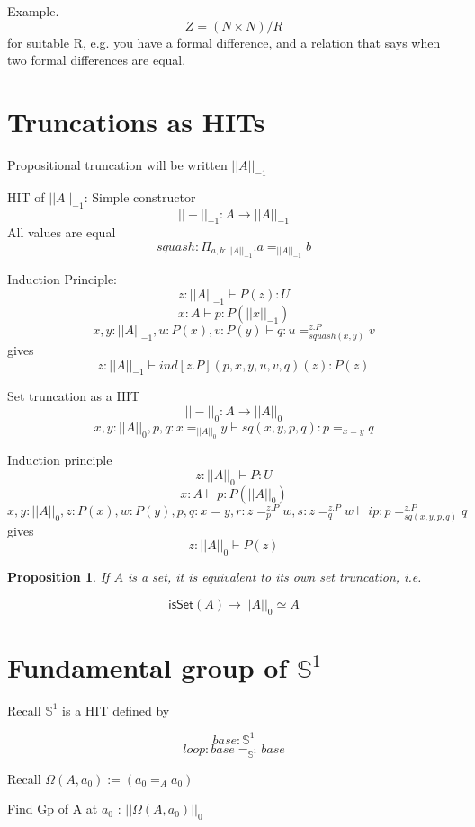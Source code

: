 \documentclass[11pt]{article}
\renewcommand{\SS}{\mathbb{S}}
\newtheorem{proposition}{Proposition}
\begin{document}
Example.
$$Z = (N \times N) / R$$
for suitable R, e.g. you have a formal difference, and a relation that says when two formal differences are equal.

\section{Truncations as HITs}
\newcommand{\ntrunc}[2]{||#1||_{#2}}
\newcommand{\propt}[1]{\ntrunc{#1}{-1}}
Propositional truncation will be written $\propt{A}$

HIT of $\propt{A}$:
Simple constructor
$$\propt{-} : A \rightarrow \propt{A}$$
All values are equal
$$squash : \Pi_{a, b : \propt{A}} . a =_{\propt{A}} b$$

Induction Principle:
$$z : \propt{A} \vdash P(z) : U$$
$$x : A \vdash p : P(\propt{x})$$
$$x, y : \propt{A}, u : P(x), v : P(y) \vdash q : u =_{squash(x, y)}^{z.P} v$$
gives
$$z : \propt{A} \vdash ind[z.P](p, x, y, u, v, q)(z) : P(z)$$

Set truncation as a HIT
\newcommand{\sett}[1]{\ntrunc{#1}{0}}
$$\sett{-} : A \rightarrow \sett{A}$$
$$x, y : \sett{A}, p, q : x =_{\sett{A}} y \vdash sq(x, y, p, q) : p =_{x = y} q$$

Induction principle
$$z : \sett{A} \vdash P : U$$
$$x : A \vdash p : P(\sett{A})$$
$$x, y : \sett{A}, z : P(x), w : P(y), p, q : x = y, r : z=_p^{z.P} w, s : z =_q^{z.P} w \vdash ip : p =_{sq(x,y,p,q)}^{z.P} q$$
gives
$$z : \sett{A} \vdash P(z)$$

\begin{proposition}\label{prop:sett}
If $A$ is a set, it is equivalent to its own set truncation, i.e.

\[\mathsf{isSet}(A) \to \sett{A} \simeq A\]
\end{proposition}

\section{Fundamental group of $\SS^1$}
Recall $\SS^1$ is a HIT defined by

$$base : \SS^1$$
$$loop : base =_{\SS^1} base$$

Recall $\Omega(A, a_0) := (a_0 =_A a_0)$

Find Gp of A at $a_0$ : $\sett{\Omega(A, a_0)}$
\end{document}
